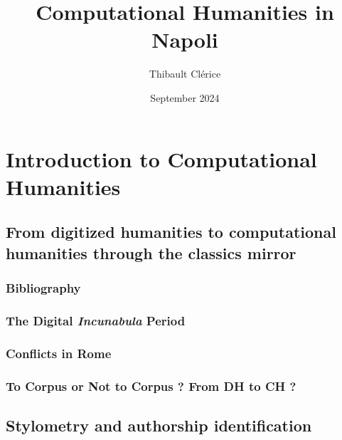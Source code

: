 \documentclass{report}
\title{Computational Humanities in Napoli}
\author{Thibault Clérice}
\date{September 2024}
\begin{document}
\maketitle

\chapter{Introduction to Computational Humanities}

\section{From digitized humanities to computational humanities through the classics mirror}

\subsection*{Bibliography}

\subsection{The Digital \textit{Incunabula} Period}

\cite{brunner_classics_1993}

\cite{helgerson_cd-rom_1988}

\cite{raben_humanities_1991}

\cite{mylonas_perseus_1993}

\subsection{Conflicts in Rome}

\cite{tombeur_informatique_1997}

\cite{tombeur_pld_1993}

\cite{tombeur_reponse_1993}

\cite{chadwick-healey_droit_1993}

\subsection{To Corpus or Not to Corpus ? From DH to CH ?}

\cite{camps_ou_2018}

\cite{poole_now_2013}

\cite{mcgillivray_tools_2013}


\section{Stylometry and authorship identification}
\end{document}
